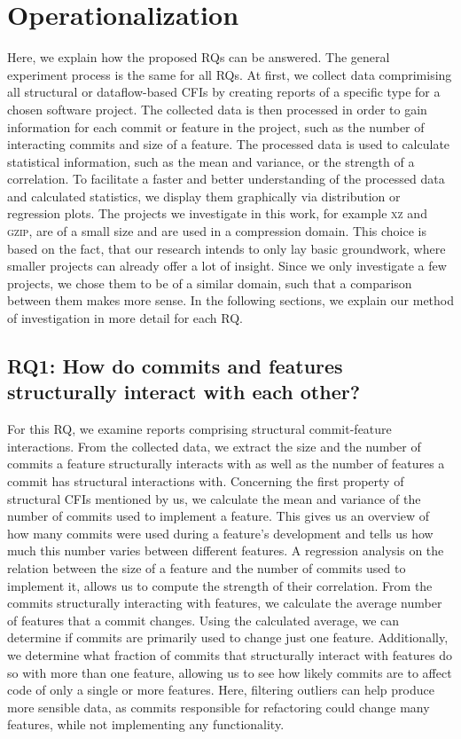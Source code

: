 \section{Operationalization}\label{sec:operationalization}

Here, we explain how the proposed RQs can be answered.
The general experiment process is the same for all RQs.
At first, we collect data comprimising all structural or dataflow-based CFIs by creating reports of a specific type for a chosen software project.
The collected data is then processed in order to gain information for each commit or feature in the project, such as the number of interacting commits and size of a feature.
The processed data is used to calculate statistical information, such as the mean and variance, or the strength of a correlation.
To facilitate a faster and better understanding of the processed data and calculated statistics, we display them graphically via distribution or regression plots.
The projects we investigate in this work, for example \textsc{xz} and \textsc{gzip}, are of a small size and are used in a compression domain.
This choice is based on the fact, that our research intends to only lay basic groundwork, where smaller projects can already offer a lot of insight.
Since we only investigate a few projects, we chose them to be of a similar domain, such that a comparison between them makes more sense.
In the following sections, we explain our method of investigation in more detail for each RQ.

\subsection*{\textbf{RQ1: How do commits and features structurally interact with each other?}}

For this RQ, we examine reports comprising structural commit-feature interactions.
From the collected data, we extract the size and the number of commits a feature structurally interacts with as well as the number of features a commit has structural interactions with.
Concerning the first property of structural CFIs mentioned by us, we calculate the mean and variance of the number of commits used to implement a feature.
This gives us an overview of how many commits were used during a feature's development and tells us how much this number varies between different features.
A regression analysis on the relation between the size of a feature and the number of commits used to implement it, allows us to compute the strength of their correlation. 
From the commits structurally interacting with features, we calculate the average number of features that a commit changes.
Using the calculated average, we can determine if commits are primarily used to change just one feature.
Additionally, we determine what fraction of commits that structurally interact with features do so with more than one feature, allowing us to see how likely commits are to affect code of only a single or more features.
Here, filtering outliers can help produce more sensible data, as commits responsible for refactoring could change many features, while not implementing any functionality. 

